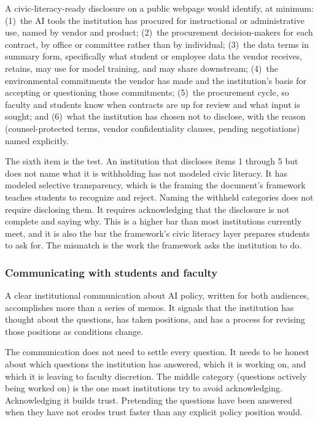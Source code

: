 \documentclass[12pt]{article}
\begin{document}
A civic-literacy-ready disclosure on a public webpage would identify, at minimum: (1)~the AI tools the institution has procured for instructional or administrative use, named by vendor and product; (2)~the procurement decision-makers for each contract, by office or committee rather than by individual; (3)~the data terms in summary form, specifically what student or employee data the vendor receives, retains, may use for model training, and may share downstream; (4)~the environmental commitments the vendor has made and the institution's basis for accepting or questioning those commitments; (5)~the procurement cycle, so faculty and students know when contracts are up for review and what input is sought; and (6)~what the institution has chosen not to disclose, with the reason (counsel-protected terms, vendor confidentiality clauses, pending negotiations) named explicitly.

The sixth item is the test. An institution that discloses items 1 through 5 but does not name what it is withholding has not modeled civic literacy. It has modeled selective transparency, which is the framing the document's framework teaches students to recognize and reject. Naming the withheld categories does not require disclosing them. It requires acknowledging that the disclosure is not complete and saying why. This is a higher bar than most institutions currently meet, and it is also the bar the framework's civic literacy layer prepares students to ask for. The mismatch is the work the framework asks the institution to do.

\subsubsection*{Communicating with students and faculty}

A clear institutional communication about AI policy, written for both audiences, accomplishes more than a series of memos. It signals that the institution has thought about the questions, has taken positions, and has a process for revising those positions as conditions change.

The communication does not need to settle every question. It needs to be honest about which questions the institution has answered, which it is working on, and which it is leaving to faculty discretion. The middle category (questions actively being worked on) is the one most institutions try to avoid acknowledging. Acknowledging it builds trust. Pretending the questions have been answered when they have not erodes trust faster than any explicit policy position would.
\end{document}
